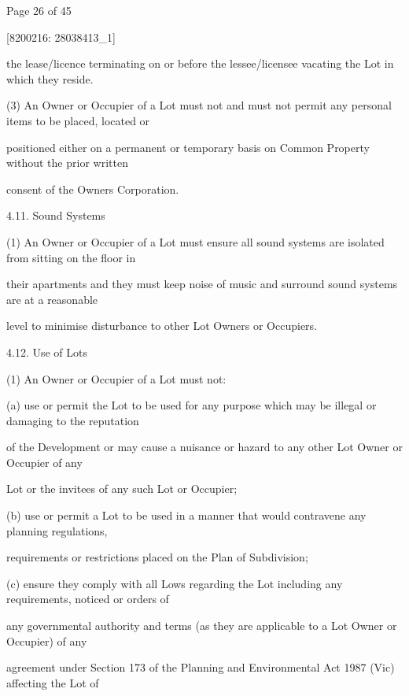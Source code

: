 \documentclass{article}
\begin{document}
{\fontsize{9}{1}Page 26  of 45 }



{\fontsize{7.02}{1}[8200216: 28038413\_1] }

{\fontsize{10.02}{1}the lease/licence terminating on or before the lessee/licensee vacating the Lot in which they reside. }

{\fontsize{9.962}{1}(3) An Owner or Occupier of a Lot must not and must not permit any personal items to be placed, located or }

{\fontsize{10.02}{1}positioned either on a permanent or temporary basis on Common Property without the prior written }

{\fontsize{10.02}{1}consent of the Owners Corporation. }

{\fontsize{9.99}{1}4.11. Sound Systems }

{\fontsize{9.962}{1}(1) An Owner or Occupier of a Lot must ensure all sound systems are isolated from sitting on the floor in }

{\fontsize{10.02}{1}their apartments and they must keep noise of music and surround sound systems are at a reasonable }

{\fontsize{10.02}{1}level to minimise disturbance to other Lot Owners or Occupiers. }

{\fontsize{9.99}{1}4.12. Use of Lots }

{\fontsize{9.962}{1}(1) An Owner or Occupier of a Lot must not: }

{\fontsize{9.962}{1}(a) use or permit the Lot to be used for any purpose which may be illegal or damaging to the reputation }

{\fontsize{10.02}{1}of the Development or may cause a nuisance or hazard to any other Lot Owner or Occupier of any }

{\fontsize{10.02}{1}Lot or the invitees of any such Lot or Occupier; }

{\fontsize{9.962}{1}(b) use or permit a Lot to be used in a manner that would contravene any planning regulations, }

{\fontsize{10.02}{1}requirements or restrictions placed on the Plan of Subdivision; }

{\fontsize{9.962}{1}(c) ensure they comply with all Lows regarding the Lot including any requirements, noticed or orders of }

{\fontsize{10.02}{1}any governmental authority and terms (as they are applicable to a Lot Owner or Occupier) of any }

{\fontsize{10.02}{1}agreement under Section 173 of the Planning and Environmental Act 1987 (Vic) affecting the Lot of }
\end{document}
